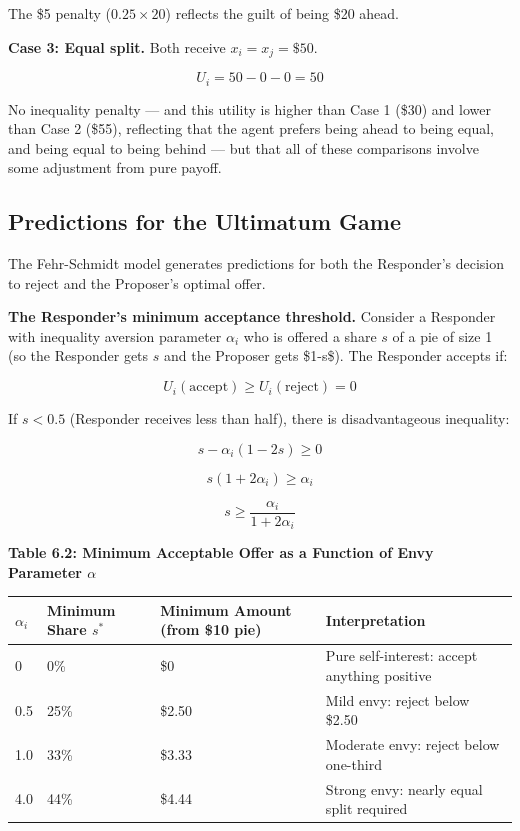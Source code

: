 \documentclass[12pt, letterpaper]{article}
\begin{document}
The \$5 penalty ($0.25 \times 20$) reflects the guilt of being \$20 ahead.

\textbf{Case 3: Equal split.} Both receive $x_i = x_j = \$50$.

\[
U_i = 50 - 0 - 0 = 50
\]

No inequality penalty --- and this utility is higher than Case 1 (\$30) and lower than Case 2 (\$55), reflecting that the agent prefers being ahead to being equal, and being equal to being behind --- but that all of these comparisons involve some adjustment from pure payoff.


\subsection{Predictions for the Ultimatum Game}


The Fehr-Schmidt model generates predictions for both the Responder's decision to reject and the Proposer's optimal offer.

\textbf{The Responder's minimum acceptance threshold.} Consider a Responder with inequality aversion parameter $\alpha_i$ who is offered a share $s$ of a pie of size 1 (so the Responder gets $s$ and the Proposer gets \$1-s\$). The Responder accepts if:

$$U_i(\text{accept}) \geq U_i(\text{reject}) = 0$$

If $s < 0.5$ (Responder receives less than half), there is disadvantageous inequality:

$$s - \alpha_i(1 - 2s) \geq 0$$

$$s(1 + 2\alpha_i) \geq \alpha_i$$

$$s \geq \frac{\alpha_i}{1 + 2\alpha_i}$$

\textbf{Table 6.2: Minimum Acceptable Offer as a Function of Envy Parameter $\alpha$}


\begin{table}[H]
\centering
\small
\begin{tabularx}{\linewidth}{lYYY}
\toprule
$\alpha_i$ & Minimum Share $s^*$ & Minimum Amount (from \$10 pie) & Interpretation \\
 & 0\% & \$0 & Pure self-interest: accept anything positive \\
0.5 & 25\% & \$2.50 & Mild envy: reject below \$2.50 \\
1.0 & 33\% & \$3.33 & Moderate envy: reject below one-third \\
4.0 & 44\% & \$4.44 & Strong envy: nearly equal split required \\
\bottomrule
\end{tabularx}
\end{table}
\end{document}
